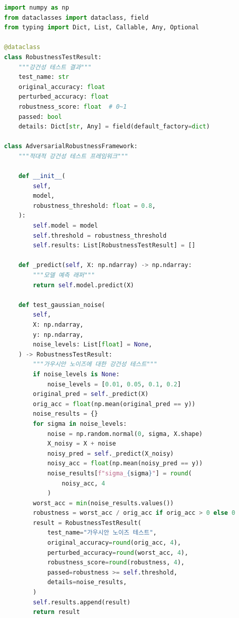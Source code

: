 \begin{lstlisting}[language=Python, caption={적대적 강건성 테스트 프레임워크}, label={lst:adversarial_test}]
import numpy as np
from dataclasses import dataclass, field
from typing import Dict, List, Callable, Any, Optional

@dataclass
class RobustnessTestResult:
    """강건성 테스트 결과"""
    test_name: str
    original_accuracy: float
    perturbed_accuracy: float
    robustness_score: float  # 0~1
    passed: bool
    details: Dict[str, Any] = field(default_factory=dict)

class AdversarialRobustnessFramework:
    """적대적 강건성 테스트 프레임워크"""

    def __init__(
        self,
        model,
        robustness_threshold: float = 0.8,
    ):
        self.model = model
        self.threshold = robustness_threshold
        self.results: List[RobustnessTestResult] = []

    def _predict(self, X: np.ndarray) -> np.ndarray:
        """모델 예측 래퍼"""
        return self.model.predict(X)

    def test_gaussian_noise(
        self,
        X: np.ndarray,
        y: np.ndarray,
        noise_levels: List[float] = None,
    ) -> RobustnessTestResult:
        """가우시안 노이즈에 대한 강건성 테스트"""
        if noise_levels is None:
            noise_levels = [0.01, 0.05, 0.1, 0.2]
        original_pred = self._predict(X)
        orig_acc = float(np.mean(original_pred == y))
        noise_results = {}
        for sigma in noise_levels:
            noise = np.random.normal(0, sigma, X.shape)
            X_noisy = X + noise
            noisy_pred = self._predict(X_noisy)
            noisy_acc = float(np.mean(noisy_pred == y))
            noise_results[f"sigma_{sigma}"] = round(
                noisy_acc, 4
            )
        worst_acc = min(noise_results.values())
        robustness = worst_acc / orig_acc if orig_acc > 0 else 0
        result = RobustnessTestResult(
            test_name="가우시안 노이즈 테스트",
            original_accuracy=round(orig_acc, 4),
            perturbed_accuracy=round(worst_acc, 4),
            robustness_score=round(robustness, 4),
            passed=robustness >= self.threshold,
            details=noise_results,
        )
        self.results.append(result)
        return result


\end{lstlisting}
